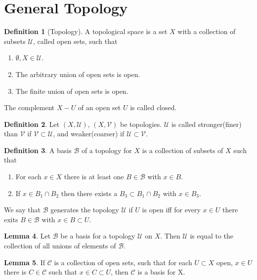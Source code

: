 \documentclass[twocolumn]{article}
\theoremstyle{definition}
\newtheorem{definition}{Definition}[section]
\newtheorem{lemma}[definition]{Lemma}
\begin{document}
\section{General Topology}
\begin{definition}[Topology]
    A topological space is a set $X$ with a collection of subsets $\mathcal{U}$, called open sets, such that
    \begin{enumerate}[noitemsep]
        \item $\emptyset, X \in \mathcal{U}$.
        \item The arbitrary union of open sets is open.
        \item The finite union of open sets is open.
    \end{enumerate}
    The complement $X - U$ of an open set $U$ is called closed.
\end{definition}
\begin{definition}
    Let $(X, \mathcal{U})$, $(X, \mathcal{V})$ be topologies.
    $\mathcal{U}$ is called stronger(finer) than $\mathcal{V}$ if $\mathcal{V} \subset \mathcal{U}$,
    and weaker(coarser) if $\mathcal{U} \subset \mathcal{V}$.
\end{definition}
\begin{definition}
    A basis $\mathcal{B}$ of a topology for $X$ is a collection of subsets of $X$ such that
    \begin{enumerate}[noitemsep]
        \item For each $x \in X$ there is at least one $B \in \mathcal{B}$ with $x \in B$.
        \item If $x \in B_1 \cap B_2$ then there exists a $B_3 \subset B_1 \cap B_2$ with $x \in B_3$.
    \end{enumerate}
    We say that $\mathcal{B}$ generates the topology $\mathcal{U}$ if $U$ is open iff for every $x \in U$ there exits $B \in \mathcal{B}$ with $x \in B \subset U$.
\end{definition}
\begin{lemma}
    Let $\mathcal{B}$ be a basis for a topology $\mathcal{U}$ on $X$.
    Then $\mathcal{U}$ is equal to the collection of all unions of elements of $\mathcal{B}$.
\end{lemma}
\begin{lemma}
    If $\mathcal{C}$ is a collection of open sets, such that for each $U \subset X$ open, $x \in U$
    there is $C \in \mathcal{C}$ such that $x \in C \subset U$, then $\mathcal{C}$ is a basis for X.
\end{lemma}
\end{document}
